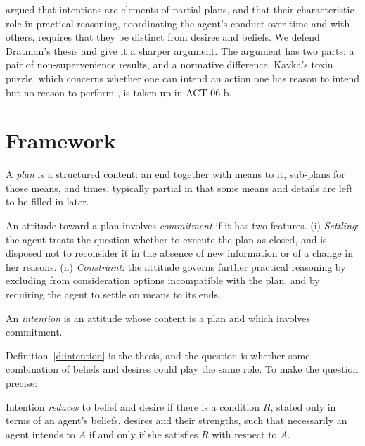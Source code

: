 \documentclass{situationist-preprint}
\begin{document}
\citet{Bratman1987} argued that intentions are elements of partial plans, and that their characteristic role in practical reasoning, coordinating the agent's conduct over time and with others, requires that they be distinct from desires and beliefs. We defend Bratman's thesis and give it a sharper argument. The argument has two parts: a pair of non-supervenience results, and a normative difference. Kavka's toxin puzzle, which concerns whether one can intend an action one has reason to intend but no reason to perform \citep{Kavka1983}, is taken up in ACT-06-b.

\section{Framework}

\begin{definition}[Plan]\label{d:plan}
A \emph{plan} is a structured content: an end together with means to it, sub-plans for those means, and times, typically partial in that some means and details are left to be filled in later.
\end{definition}

\begin{definition}[Commitment]\label{d:commit}
An attitude toward a plan involves \emph{commitment} if it has two features. (i) \emph{Settling}: the agent treats the question whether to execute the plan as closed, and is disposed not to reconsider it in the absence of new information or of a change in her reasons. (ii) \emph{Constraint}: the attitude governs further practical reasoning by excluding from consideration options incompatible with the plan, and by requiring the agent to settle on means to its ends.
\end{definition}

\begin{definition}[Intention]\label{d:intention}
An \emph{intention} is an attitude whose content is a plan and which involves commitment.
\end{definition}

Definition~\ref{d:intention} is the thesis, and the question is whether some combination of beliefs and desires could play the same role. To make the question precise:

\begin{definition}[Reduction]\label{d:reduction}
Intention \emph{reduces} to belief and desire if there is a condition $R$, stated only in terms of an agent's beliefs, desires and their strengths, such that necessarily an agent intends to $A$ if and only if she satisfies $R$ with respect to $A$.
\end{definition}
\end{document}

